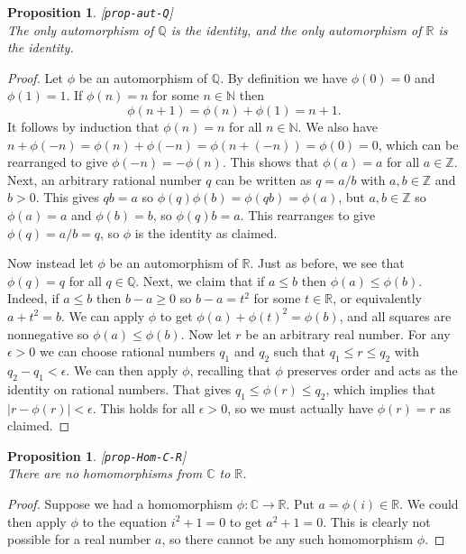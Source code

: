 \documentclass{amsart}
\newcommand{\lbl}[1]{\label{#1}\textup{[\texttt{#1}]}\ \\}
\newcommand{\lbl}{\label}
\newcommand{\N}         {{\mathbb{N}}}
\newcommand{\Z}         {{\mathbb{Z}}}
\newcommand{\Q}         {{\mathbb{Q}}}
\newcommand{\R}         {{\mathbb{R}}}
\newcommand{\C}         {{\mathbb{C}}}
\newcommand{\ep}        {\epsilon}
\renewcommand{\:}{\colon}
\newtheorem{proposition}[theorem]{Proposition}
\theoremstyle{definition}
\begin{document}
\begin{proposition}\lbl{prop-aut-Q}
 The only automorphism of $\Q$ is the identity, and the only
 automorphism of $\R$ is the identity.
\end{proposition}
\begin{proof}
 Let $\phi$ be an automorphism of $\Q$.  By definition we have
 $\phi(0)=0$ and $\phi(1)=1$.  If $\phi(n)=n$ for some $n\in\N$ then 
 \[ \phi(n+1) = \phi(n)+\phi(1) = n+1. \]
 It follows by induction that $\phi(n)=n$ for all $n\in\N$.  We also
 have $n+\phi(-n)=\phi(n)+\phi(-n)=\phi(n+(-n))=\phi(0)=0$, which can
 be rearranged to give $\phi(-n)=-\phi(n)$.  This shows that
 $\phi(a)=a$ for all $a\in\Z$.  Next, an arbitrary rational number $q$
 can be written as $q=a/b$ with $a,b\in\Z$ and $b>0$.  This gives
 $qb=a$ so $\phi(q)\phi(b)=\phi(qb)=\phi(a)$, but $a,b\in\Z$ so
 $\phi(a)=a$ and $\phi(b)=b$, so $\phi(q)b=a$.  This rearranges to
 give $\phi(q)=a/b=q$, so $\phi$ is the identity as claimed.

 Now instead let $\phi$ be an automorphism of $\R$.  Just as before,
 we see that $\phi(q)=q$ for all $q\in\Q$.  Next, we claim that if
 $a\leq b$ then $\phi(a)\leq\phi(b)$.  Indeed, if $a\leq b$ then
 $b-a\geq 0$ so $b-a=t^2$ for some $t\in\R$, or equivalently
 $a+t^2=b$.  We can apply $\phi$ to get $\phi(a)+\phi(t)^2=\phi(b)$,
 and all squares are nonnegative so $\phi(a)\leq\phi(b)$.  Now let $r$
 be an arbitrary real number.  For any $\ep>0$ we can choose rational
 numbers $q_1$ and $q_2$ such that $q_1\leq r\leq q_2$ with
 $q_2-q_1<\ep$.  We can then apply $\phi$, recalling that $\phi$
 preserves order and acts as the identity on rational numbers.  That
 gives $q_1\leq\phi(r)\leq q_2$, which implies that
 $|r-\phi(r)|<\ep$.  This holds for all $\ep>0$, so we must actually
 have $\phi(r)=r$ as claimed.
\end{proof}

\begin{proposition}\lbl{prop-Hom-C-R}
 There are no homomorphisms from $\C$ to $\R$.
\end{proposition}
\begin{proof}
 Suppose we had a homomorphism $\phi\:\C\to\R$.  Put
 $a=\phi(i)\in\R$.  We could then apply $\phi$ to the equation
 $i^2+1=0$ to get $a^2+1=0$.  This is clearly not possible for a real
 number $a$, so there cannot be any such homomorphism $\phi$.
\end{proof}
\end{document}
